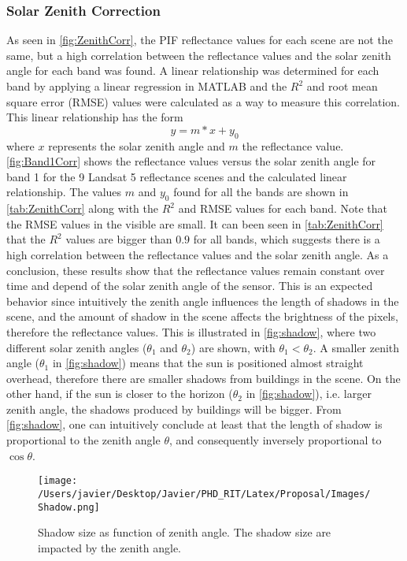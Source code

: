 \subsubsection{Solar Zenith Correction}

As seen in \autoref{fig:ZenithCorr}, the PIF reflectance values for each scene are not the same, but a high correlation between the reflectance values and the solar zenith angle for each band was found. A linear relationship was determined for each band by applying a linear regression in MATLAB and the $R^2$ and root mean square error (RMSE) values were calculated as a way to measure this correlation. This linear relationship has the form 
\begin{equation}
	y = m*x + y_0
	\label{eq:linear}
\end{equation}
where $x$ represents the solar zenith angle and $m$ the reflectance value. \autoref{fig:Band1Corr} shows the reflectance values versus the solar zenith angle for band 1 for the 9 Landsat 5 reflectance scenes and the calculated linear relationship. The values $m$ and $y_0$ found for all the bands are shown in \autoref{tab:ZenithCorr} along with the $R^2$ and RMSE values for each band. Note that the RMSE values in the visible are small. It can been seen in \autoref{tab:ZenithCorr} that the $R^2$ values are bigger than $0.9$ for all bands, which suggests there is a high correlation between the reflectance values and the solar zenith angle. As a conclusion, these results show that the reflectance values remain constant over time and depend of the solar zenith angle of the sensor. This is an expected behavior since intuitively the zenith angle influences the length of shadows in the scene, and the amount of shadow in the scene affects the brightness of the pixels, therefore the reflectance values. This is illustrated in \autoref{fig:shadow}, where two different solar zenith angles ($\theta_1$ and $\theta_2$) are shown, with $\theta_1<\theta_2$. A smaller zenith angle ($\theta_1$ in \autoref{fig:shadow}) means that the sun is positioned almost straight overhead, therefore there are smaller shadows from buildings in the scene. On the other hand, if the sun is closer to the horizon ($\theta_2$ in \autoref{fig:shadow}), i.e. larger zenith angle, the shadows produced by buildings will be bigger. From \autoref{fig:shadow}, one can intuitively conclude at least that the length of shadow is proportional to the zenith angle $\theta$, and consequently inversely proportional to $\cos{\theta}$.

\begin{figure}[!ht]
    \centering
    \texttt{[image: /Users/javier/Desktop/Javier/PHD\_RIT/Latex/Proposal/Images/Shadow.png]}
  \caption{Shadow size as function of zenith angle. The shadow size are impacted by the zenith angle. \label{fig:shadow} } 
\end{figure}

